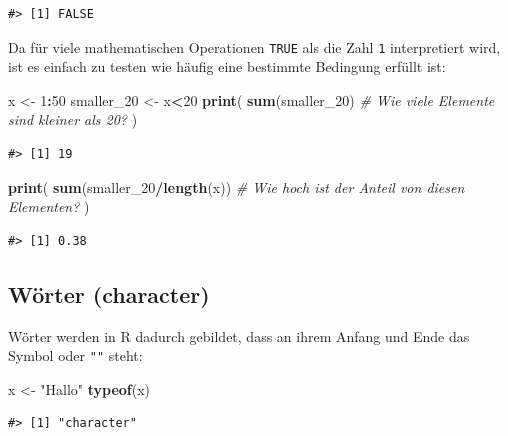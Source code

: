 \documentclass[]{book}
\newenvironment{Shaded}{\begin{snugshade}}{\end{snugshade}}
\newcommand{\KeywordTok}[1]{\textcolor[rgb]{0.13,0.29,0.53}{\textbf{#1}}}
\newcommand{\DecValTok}[1]{\textcolor[rgb]{0.00,0.00,0.81}{#1}}
\newcommand{\StringTok}[1]{\textcolor[rgb]{0.31,0.60,0.02}{#1}}
\newcommand{\CommentTok}[1]{\textcolor[rgb]{0.56,0.35,0.01}{\textit{#1}}}
\newcommand{\OperatorTok}[1]{\textcolor[rgb]{0.81,0.36,0.00}{\textbf{#1}}}
\newcommand{\NormalTok}[1]{#1}
\begin{document}
\begin{verbatim}
#> [1] FALSE
\end{verbatim}

Da für viele mathematischen Operationen \texttt{TRUE} als die Zahl
\texttt{1} interpretiert wird, ist es einfach zu testen wie häufig eine
bestimmte Bedingung erfüllt ist:

\begin{Shaded}
\begin{Highlighting}[]
\NormalTok{x <-}\StringTok{ }\DecValTok{1}\OperatorTok{:}\DecValTok{50} 
\NormalTok{smaller_}\DecValTok{20}\NormalTok{ <-}\StringTok{ }\NormalTok{x}\OperatorTok{<}\DecValTok{20} 
\KeywordTok{print}\NormalTok{(}
  \KeywordTok{sum}\NormalTok{(smaller_}\DecValTok{20}\NormalTok{) }\CommentTok{# Wie viele Elemente sind kleiner als 20?}
\NormalTok{  )}
\end{Highlighting}
\end{Shaded}

\begin{verbatim}
#> [1] 19
\end{verbatim}

\begin{Shaded}
\begin{Highlighting}[]
\KeywordTok{print}\NormalTok{(}
  \KeywordTok{sum}\NormalTok{(smaller_}\DecValTok{20}\OperatorTok{/}\KeywordTok{length}\NormalTok{(x)) }\CommentTok{# Wie hoch ist der Anteil von diesen Elementen?}
\NormalTok{)}
\end{Highlighting}
\end{Shaded}

\begin{verbatim}
#> [1] 0.38
\end{verbatim}

\subsection{Wörter (character)}\label{worter-character}

Wörter werden in R dadurch gebildet, dass an ihrem Anfang und Ende das
Symbol \texttt{\textquotesingle{}} oder \texttt{""} steht:

\begin{Shaded}
\begin{Highlighting}[]
\NormalTok{x <-}\StringTok{ "Hallo"}
\KeywordTok{typeof}\NormalTok{(x)}
\end{Highlighting}
\end{Shaded}

\begin{verbatim}
#> [1] "character"
\end{verbatim}
\end{document}
